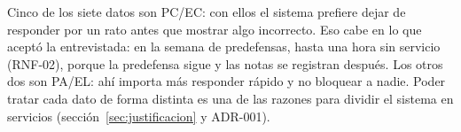 Cinco de los siete datos son PC/EC: con ellos el sistema prefiere dejar de responder por un rato antes que mostrar algo incorrecto. Eso cabe en lo que aceptó la entrevistada: en la semana de predefensas, hasta una hora sin servicio (RNF-02), porque la predefensa sigue y las notas se registran después. Los otros dos son PA/EL: ahí importa más responder rápido y no bloquear a nadie. Poder tratar cada dato de forma distinta es una de las razones para dividir el sistema en servicios (sección~\ref{sec:justificacion} y ADR-001).
